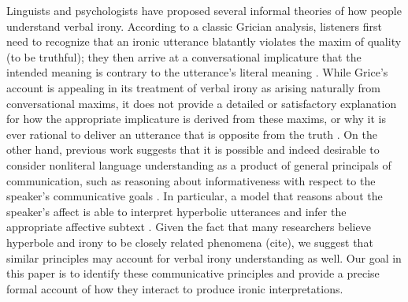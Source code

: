 \documentclass[10pt,letterpaper]{article}
\begin{document}

Linguists and psychologists have proposed several informal theories of how people understand verbal irony. According to a classic Grician analysis, listeners first need to recognize that an ironic utterance blatantly violates the maxim of quality (to be truthful); they then arrive at a conversational implicature that the intended meaning is contrary to the utterance's literal meaning \cite{grice20134, wilson2006pragmatics}. While Grice's account is appealing in its treatment of verbal irony as arising naturally from conversational maxims, it does not provide a detailed or satisfactory explanation for how the appropriate implicature is derived from these maxims, or why it is ever rational to deliver an utterance that is opposite from the truth \cite{wilson2006pragmatics}. 
On the other hand, previous work suggests that it is possible and indeed desirable to consider nonliteral language understanding as a product of general principals of communication, such as reasoning about informativeness with respect to the speaker's communicative goals \cite{kao2014nonliteral, kao2014formalizing}. In particular, a model that reasons about the speaker's affect is able to interpret hyperbolic utterances and infer the appropriate affective subtext \cite{kao2014nonliteral}. Given the fact that many researchers believe hyperbole and irony to be closely related phenomena (cite), we suggest that similar principles may account for verbal irony understanding as well. Our goal in this paper is to identify these communicative principles and provide a precise formal account of how they interact to produce ironic interpretations.
\end{document}
